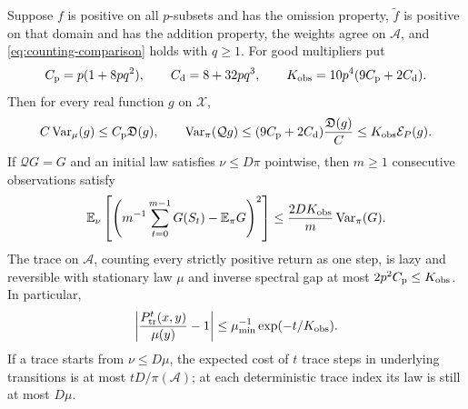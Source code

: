 \begin{proposition}
\label{prop:counting-transport}
Suppose $f$ is positive on all $p$-subsets and has the omission property,
$\widetilde f$ is positive on that domain and has the addition property,
the weights agree on $\mathcal A$, and
\eqref{eq:counting-comparison} holds with $q\geq1$.
For good multipliers put
\begin{equation}
 C_{\rm p}=p(1+8pq^2),\qquad
 C_{\rm d}=8+32pq^3,\qquad
 K_{\rm obs}=10p^4(9C_{\rm p}+2C_{\rm d}).
 \label{eq:counting-constants}
\end{equation}
Then for every real function $g$ on $\mathcal X$,
\begin{equation}
 C\operatorname{Var}_\mu(g)\leq C_{\rm p}\mathfrak D(g),\qquad
 \operatorname{Var}_\pi(\mathcal Qg)
 \leq(9C_{\rm p}+2C_{\rm d})\frac{\mathfrak D(g)}C
 \leq K_{\rm obs}\mathcal E_P(g).
 \label{eq:counting-variance}
\end{equation}
If $\mathcal QG=G$ and an initial law satisfies $\nu\leq D\pi$
pointwise, then $m\geq1$ consecutive observations satisfy
\begin{equation}
 \mathbb E_\nu\left[
  \left(m^{-1}\sum_{t=0}^{m-1}G(S_t)-\mathbb E_\pi G\right)^2\right]
 \leq\frac{2D K_{\rm obs}}m\operatorname{Var}_\pi(G).
 \label{eq:counting-time-average}
\end{equation}
The trace on $\mathcal A$, counting every strictly positive return as
one step, is lazy and reversible with stationary law $\mu$ and inverse
spectral gap at most $2p^2C_{\rm p}\leq K_{\rm obs}$.  In particular,
\begin{equation}
 \left|\frac{P_{\rm tr}^t(x,y)}{\mu(y)}-1\right|
 \leq\mu_{\min}^{-1}\exp(-t/K_{\rm obs}).
 \label{eq:counting-trace-mixing}
\end{equation}
If a trace starts from $\nu\leq D\mu$, the expected cost of $t$ trace
steps in underlying transitions is at most $tD/\pi(\mathcal A)$;
at each deterministic trace index its law is still at most $D\mu$.
\end{proposition}

